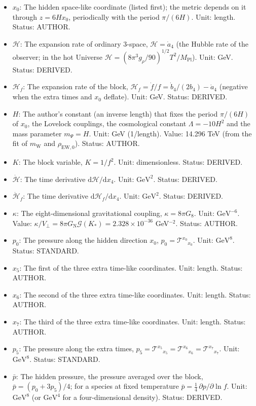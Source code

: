 \documentclass[
  10pt,
]{article}
\providecommand{\tightlist}{%
  \setlength{\itemsep}{0pt}\setlength{\parskip}{0pt}}
\begin{document}
\begin{itemize}
\tightlist
\item
  \(x_0\): The hidden space-like coordinate (listed first); the metric
  depends on it through \(z = 6Hx_0\), periodically with the period
  \(\pi/(6H)\). Unit: length. Status: AUTHOR.
\item
  \(\mathcal{H}\): The expansion rate of ordinary 3-space,
  \(\mathcal{H} = \dot a_4\) (the Hubble rate of the observer; in the
  hot Universe
  \(\mathcal{H} = (8\pi^3g_\rho/90)^{1/2}T^2/M_{\mathrm{Pl}}\)). Unit:
  GeV. Status: DERIVED.
\item
  \(\mathcal{H}_f\): The expansion rate of the block,
  \(\mathcal{H}_f = \dot f/f = \dot b_4/(2b_4) - \dot a_4\) (negative
  when the extra times and \(x_0\) deflate). Unit: GeV. Status: DERIVED.
\item
  \(H\): The author's constant (an inverse length) that fixes the period
  \(\pi/(6H)\) of \(x_0\), the Lovelock couplings, the cosmological
  constant \(\Lambda = -10H^2\) and the mass parameter \(m_\Psi = H\).
  Unit: GeV (1/length). Value: 14.296 TeV (from the fit of
  \(m_{\mathrm{W}}\) and \(\rho_{\mathrm{EW},0}\)). Status: AUTHOR.
\item
  \(K\): The block variable, \(K = 1/f^2\). Unit: dimensionless. Status:
  DERIVED.
\item
  \(\dot{\mathcal{H}}\): The time derivative
  \(\mathrm{d}\mathcal{H}/\mathrm{d}x_4\). Unit: \(\mathrm{GeV}^{2}\).
  Status: DERIVED.
\item
  \(\dot{\mathcal{H}}_f\): The time derivative
  \(\mathrm{d}\mathcal{H}_f/\mathrm{d}x_4\). Unit: \(\mathrm{GeV}^{2}\).
  Status: DERIVED.
\item
  \(\kappa\): The eight-dimensional gravitational coupling,
  \(\kappa = 8\pi G_8\). Unit: \(\mathrm{GeV}^{-6}\). Value:
  \(\kappa/V_\perp = 8\pi G_{\mathrm{N}}\mathcal{G}(K_*) = 2.328\times10^{-36}\)
  GeV\(^{-2}\). Status: AUTHOR.
\item
  \(p_0\): The pressure along the hidden direction \(x_0\),
  \(p_0 = \mathcal{T}^{x_0}{}_{x_0}\). Unit: \(\mathrm{GeV}^{8}\).
  Status: STANDARD.
\item
  \(x_5\): The first of the three extra time-like coordinates. Unit:
  length. Status: AUTHOR.
\item
  \(x_6\): The second of the three extra time-like coordinates. Unit:
  length. Status: AUTHOR.
\item
  \(x_7\): The third of the three extra time-like coordinates. Unit:
  length. Status: AUTHOR.
\item
  \(p_5\): The pressure along the extra times,
  \(p_5 = \mathcal{T}^{x_5}{}_{x_5} = \mathcal{T}^{x_6}{}_{x_6} = \mathcal{T}^{x_7}{}_{x_7}\).
  Unit: \(\mathrm{GeV}^{8}\). Status: STANDARD.
\item
  \(\bar p\): The hidden pressure, the pressure averaged over the block,
  \(\bar p = (p_0 + 3p_5)/4\); for a species at fixed temperature
  \(\bar p = \frac14\,\partial p/\partial\ln f\). Unit:
  \(\mathrm{GeV}^{8}\) (or \(\mathrm{GeV}^{4}\) for a four-dimensional
  density). Status: DERIVED.
\end{itemize}
\end{document}
